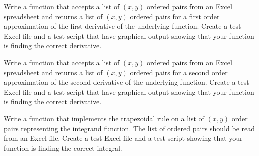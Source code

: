\begin{problem}\label{prob:first_deriv_data}
    Write a \ProgLang function that accepts a list of $(x,y)$ ordered pairs from an Excel
    spreadsheet and returns a list of $(x,y)$ ordered pairs for a first order
    approximation of the first derivative of the
    underlying function. 
    Create a test Excel file and a test script that have graphical output showing that
    your \ProgLang function is finding the correct derivative.
\end{problem}



\begin{problem}
    Write a \ProgLang function that accepts a list of $(x,y)$ ordered pairs from an Excel
    spreadsheet and returns a list of $(x,y)$ ordered pairs for a second order
    approximation of the second derivative of the
    underlying function. 
    Create a test Excel file and a test script that have graphical output showing that
    your \ProgLang function is finding the correct derivative.
\end{problem}


\begin{problem}\label{prob:trap_from_data}
    Write a \ProgLang function that implements the trapezoidal rule on a list of $(x,y)$
    order pairs representing the integrand function.  The list of ordered pairs should be
    read from an Excel file. 
    Create a test Excel file and a test script showing that your \ProgLang function is
    finding the correct integral.
\end{problem}


